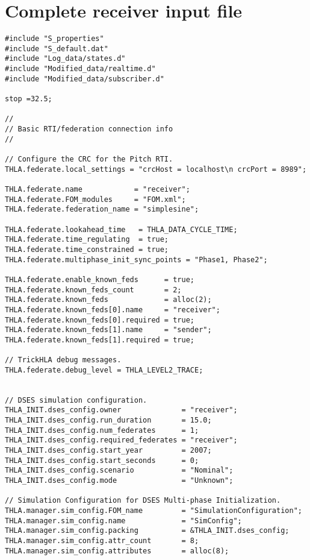 \clearpage

\section{Complete receiver input file}\label{sec:complete-receiver-input}

\begin{lstlisting}[caption={{\tt SIM\_simplesine\_hla\_receiveInt} input file},label={list:complete-receiver-input}]
#include "S_properties"
#include "S_default.dat"
#include "Log_data/states.d"
#include "Modified_data/realtime.d"
#include "Modified_data/subscriber.d"

stop =32.5; 

//
// Basic RTI/federation connection info
//

// Configure the CRC for the Pitch RTI.
THLA.federate.local_settings = "crcHost = localhost\n crcPort = 8989";

THLA.federate.name            = "receiver"; 
THLA.federate.FOM_modules     = "FOM.xml"; 
THLA.federate.federation_name = "simplesine"; 

THLA.federate.lookahead_time   = THLA_DATA_CYCLE_TIME;
THLA.federate.time_regulating  = true; 
THLA.federate.time_constrained = true; 
THLA.federate.multiphase_init_sync_points = "Phase1, Phase2";

THLA.federate.enable_known_feds      = true; 
THLA.federate.known_feds_count       = 2; 
THLA.federate.known_feds             = alloc(2); 
THLA.federate.known_feds[0].name     = "receiver"; 
THLA.federate.known_feds[0].required = true; 
THLA.federate.known_feds[1].name     = "sender"; 
THLA.federate.known_feds[1].required = true; 

// TrickHLA debug messages.
THLA.federate.debug_level = THLA_LEVEL2_TRACE;


// DSES simulation configuration.
THLA_INIT.dses_config.owner              = "receiver";
THLA_INIT.dses_config.run_duration       = 15.0;
THLA_INIT.dses_config.num_federates      = 1;
THLA_INIT.dses_config.required_federates = "receiver";
THLA_INIT.dses_config.start_year         = 2007;
THLA_INIT.dses_config.start_seconds      = 0;
THLA_INIT.dses_config.scenario           = "Nominal";
THLA_INIT.dses_config.mode               = "Unknown";

// Simulation Configuration for DSES Multi-phase Initialization.
THLA.manager.sim_config.FOM_name         = "SimulationConfiguration";
THLA.manager.sim_config.name             = "SimConfig";
THLA.manager.sim_config.packing          = &THLA_INIT.dses_config;
THLA.manager.sim_config.attr_count       = 8;
THLA.manager.sim_config.attributes       = alloc(8);


\end{lstlisting}
